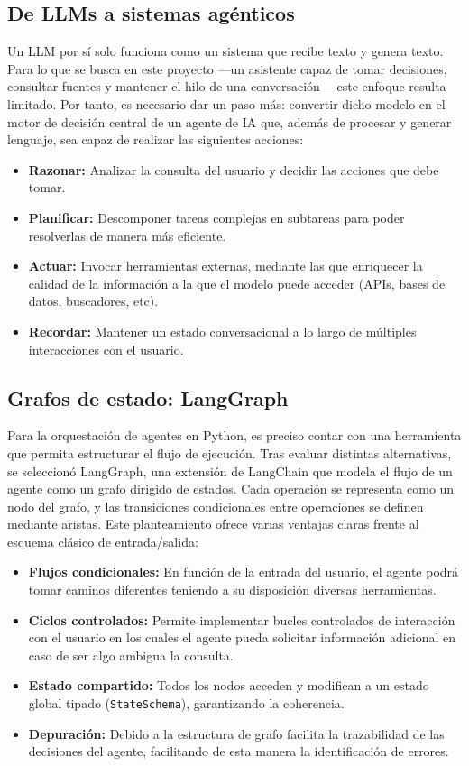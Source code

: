 \documentclass[12pt,a4paper,oneside]{report}
\begin{document}
\subsection{De LLMs a sistemas agénticos}

Un LLM por sí solo funciona como un sistema que recibe texto y genera texto. Para lo que se busca en este proyecto ---un asistente capaz de tomar decisiones, consultar fuentes y mantener el hilo de una conversación--- este enfoque resulta limitado. Por tanto, es necesario dar un paso más: convertir dicho modelo en el motor de decisión central de un agente de IA que, además de procesar y generar lenguaje, sea capaz de realizar las siguientes acciones:

\begin{itemize}
    \item \textbf{Razonar:} Analizar la consulta del usuario y decidir las acciones que debe tomar.
    \item \textbf{Planificar:} Descomponer tareas complejas en subtareas para poder resolverlas de manera más eficiente.
    \item \textbf{Actuar:} Invocar herramientas externas, mediante las que enriquecer la calidad de la información a la que el modelo puede acceder (APIs, bases de datos, buscadores, etc).
    \item \textbf{Recordar:} Mantener un estado conversacional a lo largo de múltiples interacciones con el usuario.
\end{itemize}

\subsection{Grafos de estado: LangGraph}

Para la orquestación de agentes en Python, es preciso contar con una herramienta que permita estructurar el flujo de ejecución. Tras evaluar distintas alternativas, se seleccionó LangGraph, una extensión de LangChain que modela el flujo de un agente como un grafo dirigido de estados. Cada operación se representa como un nodo del grafo, y las transiciones condicionales entre operaciones se definen mediante aristas.
Este planteamiento ofrece varias ventajas claras frente al esquema clásico de entrada/salida:

\begin{itemize}
    \item \textbf{Flujos condicionales:} En función de la entrada del usuario, el agente podrá tomar caminos diferentes teniendo a su disposición diversas herramientas.
    \item \textbf{Ciclos controlados:} Permite implementar bucles controlados de interacción con el usuario en los cuales el agente pueda solicitar información adicional en caso de ser algo ambigua la consulta.
    \item \textbf{Estado compartido:} Todos los nodos acceden y modifican a un estado global tipado (\texttt{StateSchema}), garantizando la coherencia.
    \item \textbf{Depuración:} Debido a la estructura de grafo facilita la trazabilidad de las decisiones del agente, facilitando de esta manera la identificación de errores.
\end{itemize}
\end{document}
